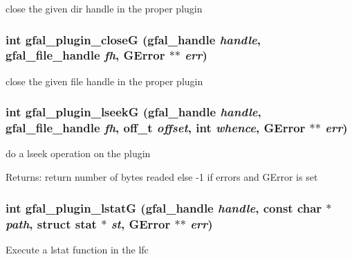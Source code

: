 close the given dir handle in the proper plugin 
\subsubsection{\setlength{\rightskip}{0pt plus 5cm}int gfal\_\-plugin\_\-close\-G (gfal\_\-handle {\em handle}, gfal\_\-file\_\-handle {\em fh}, GError $\ast$$\ast$ {\em err})}\label{gfal__common__plugin_8h_13d1db9798e5a830c745e2f909a484f4}


close the given file handle in the proper plugin 
\subsubsection{\setlength{\rightskip}{0pt plus 5cm}int gfal\_\-plugin\_\-lseek\-G (gfal\_\-handle {\em handle}, gfal\_\-file\_\-handle {\em fh}, off\_\-t {\em offset}, int {\em whence}, GError $\ast$$\ast$ {\em err})}\label{gfal__common__plugin_8h_c29b06ae43aa86049b513d1174393019}


do a lseek operation on the plugin \begin{Desc}
\item[Returns:]return number of bytes readed else -1 if errors and GError is set \end{Desc}
\subsubsection{\setlength{\rightskip}{0pt plus 5cm}int gfal\_\-plugin\_\-lstat\-G (gfal\_\-handle {\em handle}, const char $\ast$ {\em path}, struct stat $\ast$ {\em st}, GError $\ast$$\ast$ {\em err})}\label{gfal__common__plugin_8h_81a0d301234958fc59518fb6ce306425}


Execute a lstat function in the lfc 
